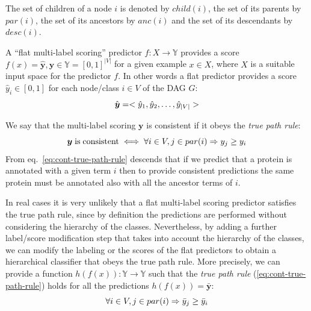 \documentclass{bioinfo}
\newcommand{\by}{\boldsymbol{y}}
\begin{document}
\begin{methods}
The set of children of a node $i$ is denoted by $child(i)$, the set of its parents by $par(i)$, the set of its ancestors by $anc(i)$ and the set of its descendants by $desc(i)$.

A ``flat multi-label scoring'' predictor  $f: X \rightarrow \mathbb{Y}$ provides a score $f(x) = \hat{\by},  \hat{\by} \in \mathbb{Y}=[0,1]^{|V|}$ for a given example $x \in X$, where $X$ is a suitable input space for the predictor $f$. In other words a flat predictor provides a score $\hat{y}_i \in [0,1]$ for each node/class $i \in V$ of the DAG $G$:
\vspace*{-5pt}
\begin{equation}
\hat{\by} = < \hat{y}_1, \hat{y}_2, \ldots, \hat{y}_{|V|}>
\vspace*{-5pt}
\end{equation} 


We say that the multi-label scoring $\by$ is consistent if it obeys the {\em true path rule}:
\vspace*{-5pt}
\begin{equation} 
\by \; {\rm is \; consistent}  \iff \forall i \in V, j \in par(i) \Rightarrow y_j \geq y_i 
\label{eq:cont-true-path-rule}
\vspace*{-5pt}
\end{equation}
From eq.~\ref{eq:cont-true-path-rule} descends that if we predict that a protein is annotated with a given term $i$ then to provide consistent predictions the same protein must be annotated also with all the ancestor terms of $i$.

In real cases it is very unlikely that a flat multi-label scoring predictor  satisfies the true path rule, since by definition the predictions are performed without considering the hierarchy of the classes. 
Nevertheless, by adding a further label/score modification step that takes into account the hierarchy of the classes, we can modify the labeling or the scores of the flat predictors to obtain a hierarchical classifier that obeys the true path rule. 
More precisely, we can provide a function $h(f(x)): \mathbb{Y} \rightarrow \mathbb{Y}$ such that the {\em true path rule} (\ref{eq:cont-true-path-rule}) holds for all the predictions $h(f(x)) = \bar{\by}$:
\vspace*{-5pt}
\begin{equation} 
 \forall i \in V, j \in par(i) \Rightarrow \bar{y}_j \geq \bar{y}_i 
\label{eq:vlid-hier-corr}
\vspace*{-0pt}
\end{equation}



\end{methods}
\end{document}
